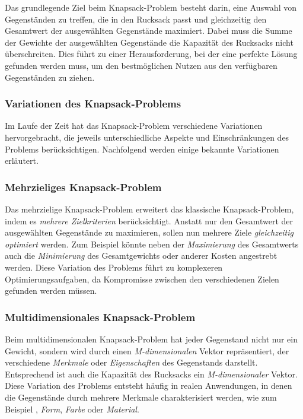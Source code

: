 Das grundlegende Ziel beim Knapsack-Problem besteht darin, eine Auswahl von Gegenständen zu treffen, die in den Rucksack
passt und gleichzeitig den Gesamtwert der ausgewählten Gegenstände maximiert. Dabei muss die Summe der Gewichte der
ausgewählten Gegenstände die Kapazität des Rucksacks nicht überschreiten. Dies führt zu einer Herausforderung, bei der
eine perfekte Lösung gefunden werden muss, um den bestmöglichen Nutzen aus den verfügbaren Gegenständen zu ziehen.

\subsubsection{Variationen des Knapsack-Problems}
Im Laufe der Zeit hat das Knapsack-Problem verschiedene Variationen hervorgebracht, die jeweils unterschiedliche Aspekte
und Einschränkungen des Problems berücksichtigen. Nachfolgend werden einige bekannte Variationen erläutert.

\subsubsection*{Mehrzieliges Knapsack-Problem}
Das mehrzielige Knapsack-Problem erweitert das klassische Knapsack-Problem, indem es \textit{mehrere Zielkriterien}
berücksichtigt. Anstatt nur den Gesamtwert der ausgewählten Gegenstände zu maximieren, sollen nun mehrere Ziele \textit{gleichzeitig optimiert}
werden. Zum Beispiel könnte neben der \textit{Maximierung} des Gesamtwerts auch die \textit{Minimierung} des Gesamtgewichts
oder anderer Kosten angestrebt werden. Diese Variation des Problems führt zu komplexeren Optimierungsaufgaben, da
Kompromisse zwischen den verschiedenen Zielen gefunden werden müssen.

\subsubsection*{Multidimensionales Knapsack-Problem}
Beim multidimensionalen Knapsack-Problem hat jeder Gegenstand nicht nur ein Gewicht, sondern wird durch einen \textit{M-dimensionalen}
Vektor repräsentiert, der verschiedene \textit{Merkmale} oder \textit{Eigenschaften} des Gegenstands darstellt. Entsprechend
ist auch die Kapazität des Rucksacks ein \textit{M-dimensionaler} Vektor. Diese Variation des Problems entsteht häufig
in realen Anwendungen, in denen die Gegenstände durch mehrere Merkmale charakterisiert werden, wie zum Beispiel ,
\textit{Form}, \textit{Farbe} oder \textit{Material}.

